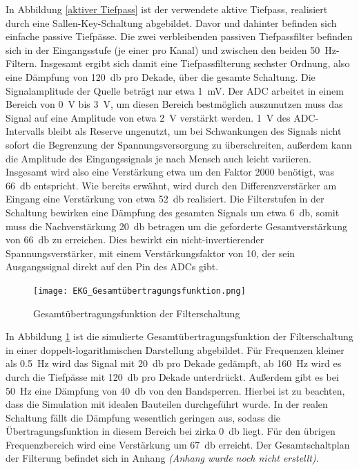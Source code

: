 In Abbildung \ref{aktiver Tiefpass} ist der verwendete aktive Tiefpass, realisiert durch eine Sallen-Key-Schaltung abgebildet. Davor und dahinter befinden sich einfache passive Tiefpässe. Die zwei verbleibenden passiven Tiefpassfilter befinden sich in der Eingangsstufe (je einer pro Kanal) und zwischen den beiden \SI{50}{\hertz}-Filtern. Insgesamt ergibt sich damit eine Tiefpassfilterung sechster Ordnung, also eine Dämpfung von \SI{120}{\decibel} pro Dekade, über die gesamte Schaltung. Die Signalamplitude der Quelle beträgt nur etwa \SI{1}{\milli\volt}. Der ADC arbeitet in einem Bereich von \SI{0}{\volt} bis \SI{3}{\volt}, um diesen Bereich bestmöglich auszunutzen muss das Signal auf eine Amplitude von etwa \SI{2}{\volt} verstärkt werden. \SI{1}{\volt} des ADC-Intervalls bleibt als Reserve ungenutzt, um bei Schwankungen des Signals nicht sofort die Begrenzung der Spannungsversorgung zu überschreiten, außerdem kann die Amplitude des Eingangssignals je nach Mensch auch leicht variieren. Insgesamt wird also eine Verstärkung etwa um den Faktor 2000 benötigt, was \SI{66}{\decibel} entspricht. Wie bereits erwähnt, wird durch den Differenzverstärker am Eingang eine Verstärkung von etwa \SI{52}{\decibel} realisiert. Die Filterstufen in der Schaltung bewirken eine Dämpfung des gesamten Signals um etwa \SI{6}{\decibel}, somit muss die Nachverstärkung \SI{20}{\decibel} betragen um die geforderte Gesamtverstärkung von \SI{66}{\decibel} zu erreichen. Dies bewirkt ein nicht-invertierender Spannungsverstärker, mit einem Verstärkungsfaktor von 10, der sein Ausgangssignal direkt auf den Pin des ADCs gibt.

\begin{figure} [!h]
	\texttt{[image: EKG\_Gesamtübertragungsfunktion.png]}
	\caption{Gesamtübertragungsfunktion der Filterschaltung}
	\label{Bodediagramm Filterschaltung} 
\end{figure}

In Abbildung \ref{Bodediagramm Filterschaltung} ist die simulierte Gesamtübertragungsfunktion der Filterschaltung in einer doppelt-logarithmischen Darstellung abgebildet. Für Frequenzen kleiner als \SI{0,5}{\hertz} wird das Signal mit \SI{20}{\decibel} pro Dekade gedämpft, ab \SI{160}{\hertz} wird es durch die Tiefpässe mit \SI{120}{\decibel} pro Dekade unterdrückt. Außerdem gibt es bei \SI{50}{\hertz} eine Dämpfung von \SI{40}{\decibel} von den Bandsperren. Hierbei ist zu beachten, dass die Simulation mit idealen Bauteilen durchgeführt wurde. In der realen Schaltung fällt die Dämpfung wesentlich geringen aus, sodass die Übertragungsfunktion in diesem Bereich bei zirka \SI{0}{\decibel} liegt. Für den übrigen Frequenzbereich wird eine Verstärkung um \SI{67}{\decibel} erreicht. Der Gesamtschaltplan der Filterung befindet sich in Anhang \textit{(Anhang wurde noch nicht erstellt)}. 

